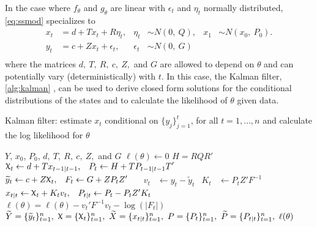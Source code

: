 \documentclass[12pt]{article}
\DeclareRobustCommand{\varx}{{\mathpalette\irchi\relax}}
\newcommand{\irchi}[2]{\protect\raisebox{\depth}{$#1\upchi$}}
\begin{document}
In the case where $f_\theta$ and $g_\theta$ are linear with $\epsilon_t$ and
$\eta_t$ normally distributed, \eqref{eq:ssmod} specializes to
\begin{equation}
  \begin{aligned}
    x_{t}&= d+T x_t + R\eta_{t}, 
    & \eta_t &\sim N(0,\ Q),     
    &x_1 &\sim N(x_0,\ P_0).\\
    y_t&= c + Z x_t + \epsilon_t,     
    & \epsilon_t &\sim N(0,\ G) \\
  \end{aligned}
  \label{eq:lgmod}
\end{equation}
where the matrices $d,\ T,\ R,\ c,\ Z,$ and $G$ are allowed to depend
on $\theta$ and can potentially vary (deterministically) with $t$. In this case,
the Kalman filter, \autoref{alg:kalman} \citep[see e.g.][]{Kalman1960,Harvey1990},
can be used to derive closed form 
solutions for the conditional
distributions of the states and to calculate the likelihood of $\theta$
given data. 
\begin{algorithm}[t!]
  \begin{singlespace}
  \caption{Kalman filter: estimate $x_t$ conditional on
    $\{y_j\}_{j=1}^t$, for all $t=1,\ldots,n$ and calculate the log likelihood
    for $\theta$\label{alg:kalman}}
  \begin{algorithmic}
     $Y$, $x_0$, $P_0$, $d,\ T,\ R,\ c,\ Z,$ and $G$
    \STATE $\ell(\theta) \leftarrow 0$ 
    \STATE $H = RQR'$ 
    \STATE $\begin{aligned}\varx_{t}
      &\leftarrow d + T x_{t-1|t-1}, & P_{t} &\leftarrow H + T P_{t-1|t-1}
      T'\end{aligned}$ 
    \STATE $\begin{aligned}\widetilde{y}_{t}
      &\leftarrow c + Z \varx_{t}, & F_{t} &\leftarrow G + Z P_{t}
      Z'\end{aligned}$ 
    \STATE $\begin{aligned}v_{t}&\leftarrow y_t-\widetilde{y}_t& K_t&
      \leftarrow P_t Z' F^{-1}\end{aligned}$ 
    \STATE $\begin{aligned} x_{t|t}
      &\leftarrow \varx_t + K_t v_t, & P_{t|t} &\leftarrow P_t - P_tZ'
      K_t\end{aligned}$ 
    \STATE $\ell(\theta) = \ell(\theta) -v_t'F^{-1}v_t - \log(|F_t|)$
    \ENDFOR
    \RETURN $\widetilde{Y}=\{\widetilde{y}_t\}_{t=1}^n,\ \varx=\{\varx_t\}_{t=1}^n,\
    \widetilde{X}=\{x_{t|t}\}_{t=1}^n,\ P=\{P_t\}_{t=1}^n,\
    \widetilde{P}=\{P_{t|t}\}_{t=1}^n,\ \ell(\theta)$
  \end{algorithmic}
\end{singlespace}
\end{algorithm}
\end{document}
